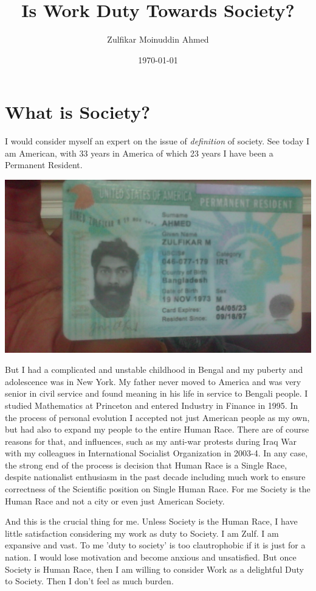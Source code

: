 \documentclass{amsart}
\title{Is Work Duty Towards Society?}
\author{Zulfikar Moinuddin Ahmed}
\date{\today}
\begin{document}
\maketitle

\section{What is Society?}
I would consider myself an expert on the issue of {\em definition} of society.  See today I am American, with 33 years in America of which 23 years I have been a Permanent Resident. 

\includegraphics[scale=0.26]{gc.png}

But I had a complicated and unstable childhood in Bengal and my puberty and adolescence was in New York.  My father never moved to America and was very senior in civil service and found meaning in his life in service to Bengali people.  I studied Mathematics at Princeton and entered Industry in Finance in 1995.  In the process of personal evolution I accepted not just American people as my own, but had also to expand my people to the entire Human Race.  There are of course reasons for that, and influences, such as my anti-war protests during Iraq War with my colleagues in International Socialist Organization in 2003-4.  In any case, the strong end of the process is decision that Human Race is a Single Race, despite nationalist enthusiasm in the past decade including much work to ensure correctness of the Scientific position on Single Human Race. For me Society is the Human Race and not a city or even just American Society.

And this is the crucial thing for me.  Unless Society is the Human Race, I have little satisfaction considering my work as duty to Society.  I am Zulf.  I am expansive and vast.  To me 'duty to society' is too clautrophobic if it is just for a nation.  I would lose motivation and become anxious and unsatisfied.  But once Society is Human Race, then I am willing to consider Work as a delightful Duty to Society.  Then I don't feel as much burden.
\end{document}
